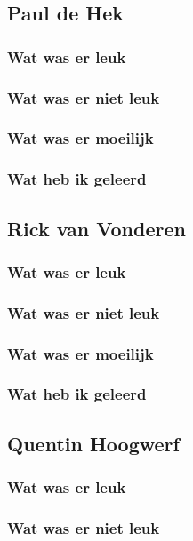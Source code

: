 \documentclass[../main.tex]{subfiles}
\begin{document}
\subsection{Paul de Hek}
\subsubsection{Wat was er leuk}
\subsubsection{Wat was er niet leuk}
\subsubsection{Wat was er moeilijk}
\subsubsection{Wat heb ik geleerd}
\newpage

\subsection{Rick van Vonderen}
\subsubsection{Wat was er leuk}
\subsubsection{Wat was er niet leuk}
\subsubsection{Wat was er moeilijk}
\subsubsection{Wat heb ik geleerd}
\newpage

\subsection{Quentin Hoogwerf}
\subsubsection{Wat was er leuk}
\subsubsection{Wat was er niet leuk}
\end{document}
